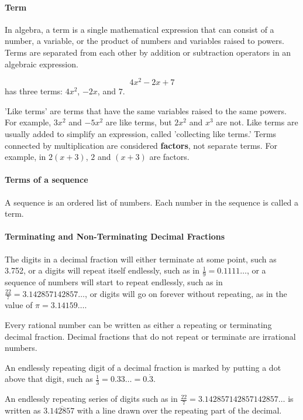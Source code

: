 \documentclass[12pt]{article}
\begin{document}
\paragraph{Term}
In algebra, a term is a single mathematical expression that can consist of a number, a variable, or the product of numbers and variables raised to powers. Terms are separated from each other by addition or subtraction operators in an algebraic expression.

\[4x^2 - 2x + 7\] has three terms: \(4x^2\), \(-2x\), and \(7\).

'Like terms' are terms that have the same variables raised to the same powers. For example, \(3x^2\) and \(-5x^2\) are like terms, but \(2x^2\) and \(x^3\) are not. Like terms are usually added to simplify an expression, called 'collecting like terms.' Terms connected by multiplication are considered \textbf{factors}, not separate terms. For example, in \(2(x+3)\), \(2\) and \((x+3)\) are factors.

\paragraph{Terms of a sequence}
A sequence is an ordered list of numbers. Each number in the sequence is called a term.

\paragraph{Terminating and Non-Terminating Decimal Fractions}
The digits in a decimal fraction will either terminate at some point, such as 3.752, or a digits will repeat itself endlessly, such as in $\frac{1}{9}=0.1111\dots$, or a sequence of numbers will start to repeat endlessly, such as in $\frac{22}{7}=3.142857142857\dots$, or digits will go on forever without repeating, as in the value of $\pi = 3.14159\dots$.

Every rational number can be written as either a repeating or terminating decimal fraction. Decimal fractions that do not repeat or terminate are irrational numbers.

An endlessly repeating digit of a decimal fraction is marked by putting a dot above that digit, such as $\frac{1}{3}=0.33\ldots=0.\dot{3}.$

An endlessly repeating series of digits such as in $\frac{22}{7}=3.142857142857142857\dots$ is written as $3.\overline{142857}$ with a line drawn over the repeating part of the decimal.
\end{document}
